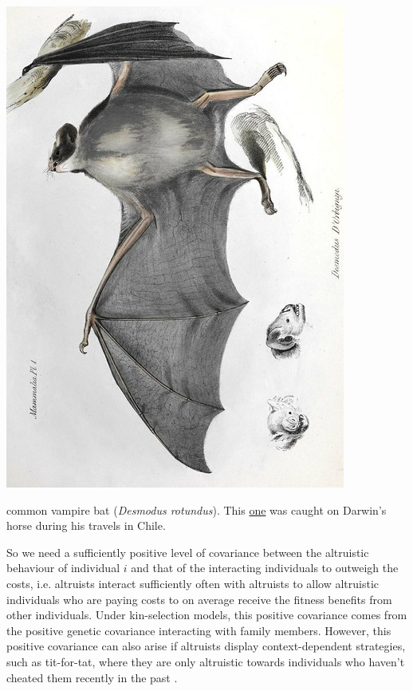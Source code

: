 \begin{marginfigure}
\begin{center}
\includegraphics[width= \textwidth]{illustration_images/Quant_gen/vampire_bat/Vampire_bat_rotated.png}
\end{center}
\caption{common vampire bat ({\it Desmodus rotundus}). This \href{https://www.biodiversitylibrary.org/page/40299740\#page/274/mode/1up}{one} was
  caught on Darwin's horse during his travels in Chile.  } \label{fig:vampire_bat}  
\end{marginfigure}

So we need a sufficiently positive level of covariance between the
altruistic behaviour of individual $i$ and that of the interacting
individuals to outweigh the costs, i.e. altruists interact
sufficiently often with altruists to allow altruistic individuals who are paying costs to on average
receive the fitness benefits from other individuals.  Under kin-selection models, this positive covariance comes from the positive
genetic covariance interacting with family members. However, this positive covariance can also arise
if altruists display context-dependent strategies, such as tit-for-tat, where they are only
altruistic towards individuals who haven't cheated them recently in the
past \citep{queller2011expanded}. 

